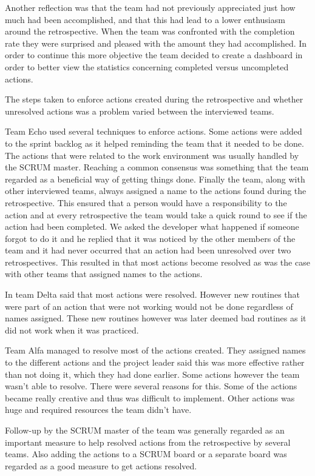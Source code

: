 Another reflection was that the team had not previously appreciated just how much had been accomplished, and that this had lead to a lower enthusiasm around the retrospective. When the team was confronted with the completion rate they were surprised and pleased with the amount they had accomplished. In order to continue this more objective the team decided to create a dashboard in order to better view the statistics concerning completed versus uncompleted actions. 

\label{question-6}
The steps taken to enforce actions created during the retrospective and whether unresolved actions was a problem varied between the interviewed teams. 

Team Echo used several techniques to enforce actions. Some actions were added to the sprint backlog as it helped reminding the team that it needed to be done. The actions that were related to the work environment was usually handled by the SCRUM master. Reaching a common consensus was something that the team regarded as a beneficial way of getting things done. Finally the team, along with other interviewed teams, always assigned a name to the actions found during the retrospective. This ensured that a person would have a responsibility to the action and at every retrospective the team would take a quick round to see if the action had been completed. We asked the developer what happened if someone forgot to do it and he replied that it was noticed by the other members of the team and it had never occurred that an action had been unresolved over two retrospectives. This resulted in that most actions become resolved as was the case with other teams that assigned names to the actions. 

In team Delta said that most actions were resolved. However new routines that were part of an action that were not working would not be done regardless of names assigned. These new routines however was later deemed bad routines as it did not work when it was practiced. 

Team Alfa managed to resolve most of the actions created. They assigned names to the different actions and the project leader said this was more effective rather than not doing it, which they had done earlier. Some actions however the team wasn't able to resolve. There were several reasons for this. Some of the actions became really creative and thus was difficult to implement. Other actions was huge and required resources the team didn't have. 

Follow-up by the SCRUM master of the team was generally regarded as an important measure to help resolved actions from the retrospective by several teams. Also adding the actions to a SCRUM board or a separate board was regarded as a good measure to get actions resolved. 

